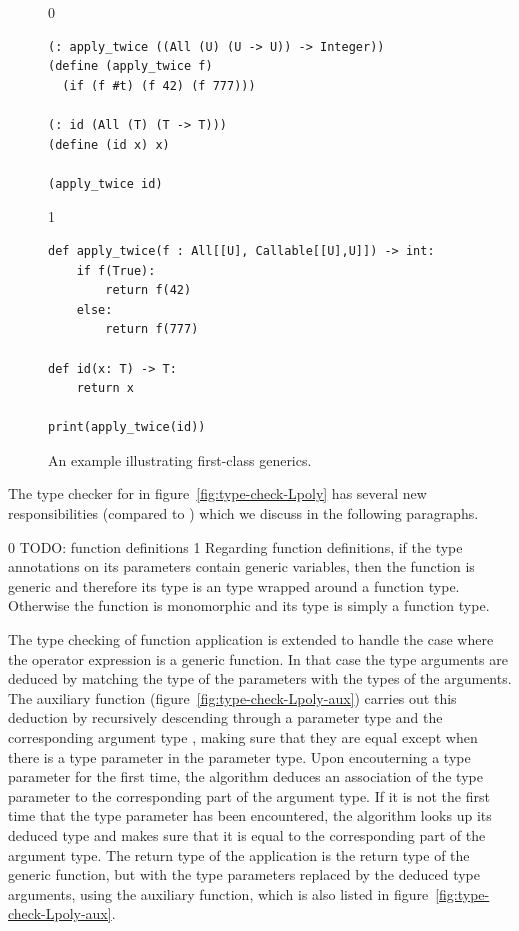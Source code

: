 \documentclass[7x10]{TimesAPriori_MIT}%
\def\racketEd{0}
\def\pythonEd{1}
\def\edition{0}
\numberwithin{theorem}{chapter}
\numberwithin{definition}{chapter}
\numberwithin{equation}{chapter}
\begin{document}
\begin{figure}[tbp]
\begin{tcolorbox}[colback=white]  
\if\edition\racketEd
\begin{lstlisting}
(: apply_twice ((All (U) (U -> U)) -> Integer))
(define (apply_twice f)
  (if (f #t) (f 42) (f 777)))

(: id (All (T) (T -> T)))
(define (id x) x)

(apply_twice id)
\end{lstlisting}
\fi
\if\edition\pythonEd
\begin{lstlisting}
def apply_twice(f : All[[U], Callable[[U],U]]) -> int:
    if f(True):
        return f(42)
    else:
        return f(777)

def id(x: T) -> T:
    return x

print(apply_twice(id))
\end{lstlisting}
\fi
\end{tcolorbox}

\caption{An example illustrating first-class generics.}
\label{fig:apply-twice}
\end{figure}



The type checker for \LangPoly{} in figure~\ref{fig:type-check-Lpoly}
has several new responsibilities (compared to \LangLam{}) which we
discuss in the following paragraphs.

\if\edition\racketEd
%
TODO: function definitions
%
\fi
\if\edition\pythonEd
%
Regarding function definitions, if the type annotations on its
parameters contain generic variables, then the function is generic and
therefore its type is an  type wrapped around a function
type. Otherwise the function is monomorphic and its type is simply
a function type.
%
\fi

The type checking of function application is extended to handle the
case where the operator expression is a generic function. In that case
the type arguments are deduced by matching the type of the parameters
with the types of the arguments.
%
The  auxiliary function
(figure~\ref{fig:type-check-Lpoly-aux}) carries out this deduction by
recursively descending through a parameter type  and
the corresponding argument type , making sure that they
are equal except when there is a type parameter in the parameter
type. Upon encouterning a type parameter for the first time, the
algorithm deduces an association of the type parameter to the
corresponding part of the argument type. If it is not the first time
that the type parameter has been encountered, the algorithm looks up
its deduced type and makes sure that it is equal to the corresponding
part of the argument type.  The return type of the application is the
return type of the generic function, but with the type parameters
replaced by the deduced type arguments, using the
 auxiliary function, which is also listed in
figure~\ref{fig:type-check-Lpoly-aux}.
\end{document}
